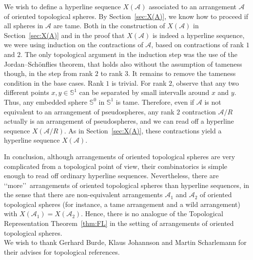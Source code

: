 \documentclass[a4paper]{amsart}
\newcommand{\p}{\mathbb S}
\theoremstyle{definition}
\theoremstyle{remark}
\begin{document}
We wish to define a hyperline sequence $X(\mathcal A)$ associated to an
arrangement $\mathcal A$ of oriented topological spheres.  By
Section~\ref{sec:X(A)}, we know how to proceed if all spheres in
$\mathcal A$ are tame. Both in the construction of $X(\mathcal A)$ in
Section~\ref{sec:X(A)} and in the proof that $X(\mathcal A)$ is indeed a
hyperline sequence, we were using induction on the contractions of
$\mathcal A$, based on contractions of rank $1$ and $2$. 
%
The only topological argument in the induction step was the use of the
Jordan--Sch\"onflies theorem, that holds also without the assumption of
tameness though, in the step from rank $2$ to rank $3$.
It remains to remove the tameness condition in the base cases.
%
Rank $1$ is trivial. 
For rank $2$, observe that any two different points $x,y\in \p^1$ can be
separated by small intervalls around $x$ and $y$. Thus, any embedded
sphere $\p^0$ in $\p^1$ is tame.
%
Therefore, even if $\mathcal A$ is not equivalent to an arrangement of
pseudospheres, any rank $2$ contraction $\mathcal A/R$ actually is an
arrangement of pseudospheres, and we can read off a hyperline sequence
$X(\mathcal A/R)$. As in Section~\ref{sec:X(A)}, these contractions
yield a hyperline sequence $X(\mathcal A)$.

In conclusion, although arrangements of oriented topological spheres are very
complicated from a topological point of view, their combinatorics is
simple enough to read off ordinary hyperline sequences. Nevertheless,
there are \lq\lq more\rq\rq\ arrangements of oriented topological spheres than hyperline
sequences, in the sense that there are non-equivalent arrangements
$\mathcal A_1$ and $\mathcal A_2$ of oriented topological spheres (for instance, a
tame arrangement and a wild arrangement) with $X(\mathcal A_1) =
X(\mathcal A_2)$. Hence, there is no analogue of the Topological
Representation Theorem~\ref{thm:FL} in the setting of arrangements of
oriented topological spheres.\\

We wish to thank Gerhard Burde, Klaus Johannson and Martin Scharlemann
for their advises for topological references.\\ 

\end{document}
